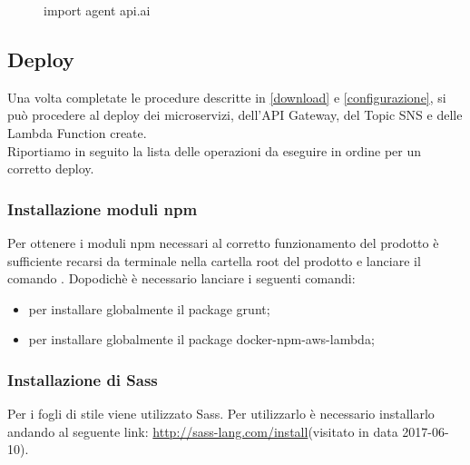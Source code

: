 \begin{figure}[H]
	\caption{import agent api.ai}\label{fig:importAgent}
\end{figure}




\subsection{Deploy}
Una volta completate le procedure descritte in \ref{download} e \ref{configurazione}, si può procedere al deploy dei microservizi, dell'API Gateway, del Topic SNS e delle Lambda Function create.\\Riportiamo in seguito la lista delle operazioni da eseguire in ordine per un corretto deploy.  

\subsubsection{Installazione moduli npm}\label{npm}
Per ottenere i moduli npm necessari al corretto funzionamento del prodotto è sufficiente recarsi da terminale nella cartella root del prodotto e lanciare il comando . Dopodichè è necessario lanciare i seguenti comandi:
\begin{itemize}
\item {} per installare globalmente il package grunt;
\item {} per installare globalmente il package docker-npm-aws-lambda;
\end{itemize}

\subsubsection{Installazione di Sass}
Per i fogli di stile viene utilizzato Sass. Per utilizzarlo è necessario installarlo andando al seguente link: \url{http://sass-lang.com/install}(visitato in data 2017-06-10).

